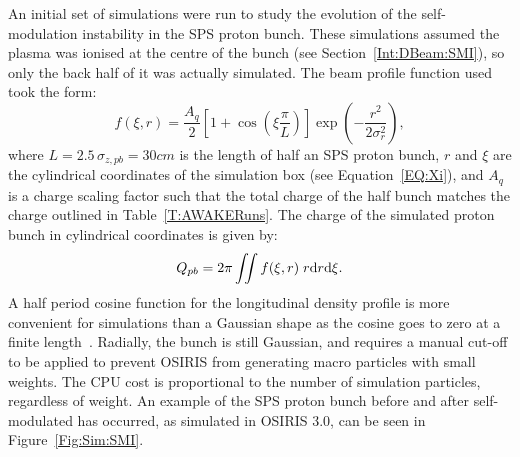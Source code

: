 An initial set of simulations were run to study the evolution of the self-modulation instability in the SPS proton bunch.
These simulations assumed the plasma was ionised at the centre of the bunch (see Section~\ref{Int:DBeam:SMI}), so only the back half of it was actually simulated.
The beam profile function used took the form:
\begin{equation}
    f(\xi,r) = \frac{A_{q}}{2} \left[1 + \cos\left(\xi\frac{\pi}{L}\right)\right] \exp\left(-\frac{r^{2}}{2\sigma_{r}^{2}}\right), \label{EQ:SPS-Profile}
\end{equation}
where $L = 2.5\,\sigma_{z,pb} = 30\unit{cm}$ is the length of half an SPS proton bunch, $r$ and $\xi$ are the cylindrical coordinates of the simulation box (see Equation~\ref{EQ:Xi}), and $A_{q}$ is a charge scaling factor such that the total charge of the half bunch matches the charge outlined in Table~\ref{T:AWAKERuns}.
The charge of the simulated proton bunch in cylindrical coordinates is given by:
\begin{equation}
    Q_{pb} = 2\pi \iint f(\xi,r) \;r \mathrm{d} r \mathrm{d} \xi. \label{EQ:SPS-Charge}
\end{equation}
A half period cosine function for the longitudinal density profile is more convenient for simulations than a Gaussian shape as the cosine goes to zero at a finite length~\cite{lotov:2010}.
Radially, the bunch is still Gaussian, and requires a manual cut-off to be applied to prevent OSIRIS from generating macro particles with small weights.
The CPU cost is proportional to the number of simulation particles, regardless of weight.
An example of the SPS proton bunch before and after self-modulated has occurred, as simulated in OSIRIS 3.0, can be seen in Figure~\ref{Fig:Sim:SMI}.

